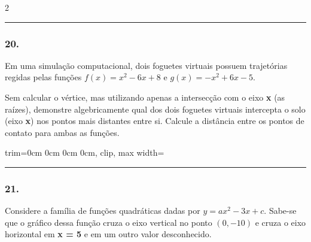 \documentclass[twoside, 10pt, a4paper]{article}
\newlength{\espacoPreQuestao}
\newlength{\espacoQuestao}
\newlength{\larguraTikz}
\begin{document}
\begin{multicols*}{2}
\noindent\textcolor{CorLinha}{\rule{\linewidth}{0.5pt}} 
\par\vspace{\espacoPreQuestao}
\subsubsection*{20.} Em uma simulação computacional, dois foguetes virtuais possuem trajetórias regidas pelas funções $f(x) = x^2 - 6x + 8$ e $g(x) = -x^2 + 6x - 5$.\par
Sem calcular o vértice, mas utilizando apenas a intersecção com o eixo \textbf{x} (as raízes), demonstre algebricamente qual dos dois foguetes virtuais intercepta o solo (eixo \textbf{x}) nos pontos mais distantes entre si. Calcule a distância entre os pontos de contato para ambas as funções.

\begin{center}
\begin{adjustbox}{trim=0cm 0cm 0cm 0cm, clip, max width=\larguraTikz}
\end{adjustbox}
\end{center}

\par\vspace{\espacoQuestao}
\noindent\textcolor{CorLinha}{\rule{\linewidth}{0.5pt}} 
\par\vspace{\espacoPreQuestao}
\subsubsection*{21.} Considere a família de funções quadráticas dadas por $y = ax^2 - 3x + c$. Sabe-se que o gráfico dessa função cruza o eixo vertical no ponto $(0, -10)$ e cruza o eixo horizontal em \textbf{x = 5} e em um outro valor desconhecido.


\end{multicols*}
\end{document}
